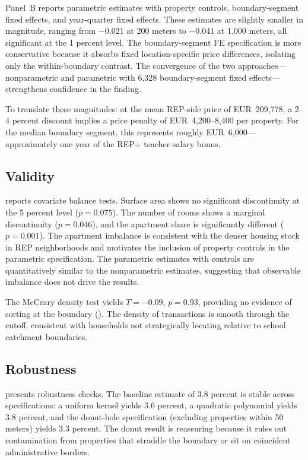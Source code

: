 \documentclass[12pt]{article}
\begin{document}
Panel~B reports parametric estimates with property controls, boundary-segment fixed effects, and year-quarter fixed effects. These estimates are slightly smaller in magnitude, ranging from $-$0.021 at 200 meters to $-$0.041 at 1,000 meters, all significant at the 1 percent level. The boundary-segment FE specification is more conservative because it absorbs fixed location-specific price differences, isolating only the within-boundary contrast. The convergence of the two approaches---nonparametric and parametric with 6,328 boundary-segment fixed effects---strengthens confidence in the finding.

To translate these magnitudes: at the mean REP-side price of EUR~209,778, a 2--4 percent discount implies a price penalty of EUR~4,200--8,400 per property. For the median boundary segment, this represents roughly EUR~6,000---approximately one year of the REP+ teacher salary bonus.



\subsection{Validity}

 reports covariate balance tests. Surface area shows no significant discontinuity at the 5 percent level ($p = 0.075$). The number of rooms shows a marginal discontinuity ($p = 0.046$), and the apartment share is significantly different ($p = 0.001$). The apartment imbalance is consistent with the denser housing stock in REP neighborhoods and motivates the inclusion of property controls in the parametric specification. The parametric estimates with controls are quantitatively similar to the nonparametric estimates, suggesting that observable imbalance does not drive the results.

The McCrary density test yields $T = -0.09$, $p = 0.93$, providing no evidence of sorting at the boundary (). The density of transactions is smooth through the cutoff, consistent with households not strategically locating relative to school catchment boundaries.



\subsection{Robustness}

 presents robustness checks. The baseline estimate of 3.8 percent is stable across specifications: a uniform kernel yields 3.6 percent, a quadratic polynomial yields 3.8 percent, and the donut-hole specification (excluding properties within 50 meters) yields 3.3 percent. The donut result is reassuring because it rules out contamination from properties that straddle the boundary or sit on coincident administrative borders.
\end{document}
